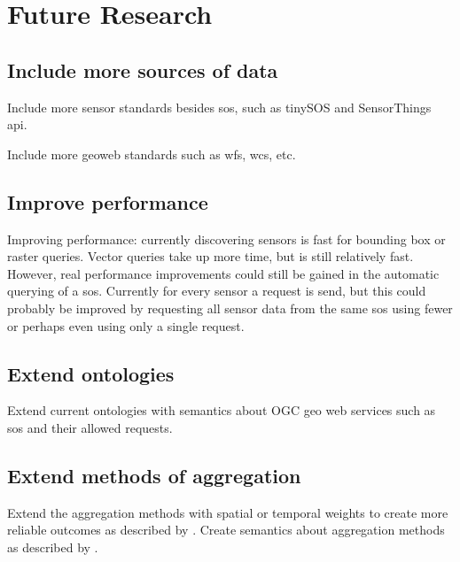
\chapter{Future Research}
\label{chap:futureResearch}

\section{Include more sources of data}
Include more sensor standards besides \ac{sos}, such as tinySOS and SensorThings \ac{api}.

Include more geoweb standards such as \ac{wfs}, \ac{wcs}, etc.

\section{Improve performance}
Improving performance: currently discovering sensors is fast for bounding box or raster queries. Vector queries take up more time, but is still relatively fast. However, real performance improvements could still be gained in the automatic querying of a \ac{sos}. Currently for every sensor a request is send, but this could probably be improved by requesting all sensor data from the same \ac{sos} using fewer or perhaps even using only a single request.  

\section{Extend ontologies}
Extend current ontologies with semantics about OGC geo web services such as \ac{sos} and their allowed requests. 

\section{Extend methods of aggregation}
Extend the aggregation methods with spatial or temporal weights to create more reliable outcomes as described by \cite{SW:Ganesan}. Create semantics about aggregation methods as described by \cite{SSW:Stasch4}. 